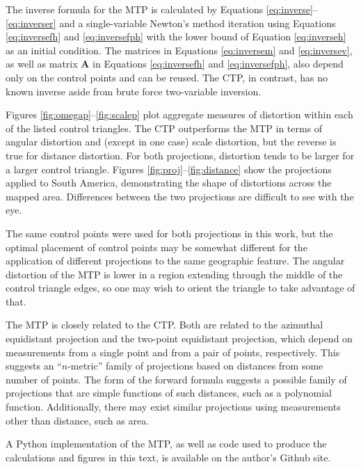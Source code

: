 \documentclass[]{interact}
\begin{document}
The inverse formula for the MTP is calculated by Equations
\ref{eq:inverse}--\ref{eq:inverser} and a single-variable Newton's method
iteration using Equations \ref{eq:inversefh} and \ref{eq:inversefph} with the
lower bound of Equation \ref{eq:inverseh} as an initial condition. The matrices
in Equations \ref{eq:inversem} and \ref{eq:inversev}, as well
as matrix $\mathbf A$ in Equations \ref{eq:inversefh} and \ref{eq:inversefph},
also depend only on the control points and can be reused. The CTP,
in contrast, has no known inverse aside from brute force two-variable inversion.

Figures \ref{fig:omegap}--\ref{fig:scalep} plot aggregate measures of distortion
within each of the listed control triangles. The CTP outperforms the MTP in
terms of angular distortion and (except in
one case) scale distortion, but the reverse is true for distance distortion. For
both projections, distortion tends to be larger for a larger control triangle.
Figures \ref{fig:proj}--\ref{fig:distance} show the projections applied to
South America, demonstrating the shape of distortions across the mapped area.
Differences between the two projections are difficult to see with the eye.

The same control points were used for both projections in this work, but the
optimal placement of control points may be somewhat different for the
application of different projections to the same geographic feature.
The angular distortion of the MTP is lower
in a region extending through the middle of the control triangle edges,
so one may wish to orient the triangle to take advantage of that.

The MTP is closely related to the CTP. Both are related to the azimuthal
equidistant projection and the two-point equidistant projection, which depend
on measurements from a single point and from a pair of points, respectively.
\citep{snyder87} This suggests an ``$n$-metric'' family of projections based on
distances from some number of points. The form of the forward formula suggests
a possible family of projections that are simple functions of such distances,
such as a polynomial function. Additionally, there may exist
similar projections using measurements other than distance, such as area.

A Python implementation of the MTP, as well as code used to
produce the calculations and figures in this text,
is available on the author's Github site. \citep{blind}%



\end{document}
